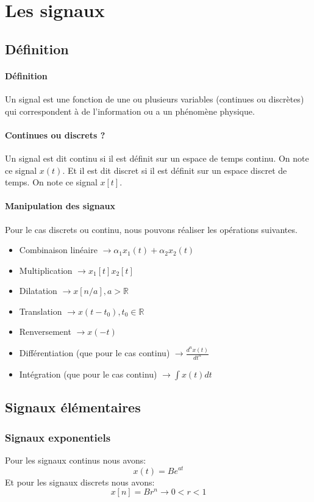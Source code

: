 \documentclass{report}
\begin{document}
\chapter{Les signaux}
\section{Définition}
\subsubsection{Définition}
Un signal est une fonction de une ou plusieurs variables (continues ou discrètes) qui correspondent à de l'information ou a un phénomène physique.

\subsubsection{Continues ou discrets ?}
Un signal est dit continu si il est définit sur un espace de temps continu. On note ce signal $x(t)$. Et il est dit discret si il est définit sur un espace discret de temps. On note ce signal $x[t]$.

\subsubsection{Manipulation des signaux}
Pour le cas discrets ou continu, nous pouvons réaliser les opérations suivantes.
\begin{itemize}
\item Combinaison linéaire $\rightarrow \alpha_{1}x_{1}(t) + \alpha_{2}x_{2}(t)$
\item Multiplication $ \rightarrow x_{1}[t]x_{2}[t]$
\item Dilatation $ \rightarrow x[n/a], a > \mathbb{R}$
\item Translation $ \rightarrow x(t - t_0), t_0 \in \mathbb{R}$
\item Renversement $ \rightarrow x(-t)$
\item Différentiation (que pour le cas continu) $ \rightarrow \frac{d^n x(t)}{dt^n}$
\item Intégration (que pour le cas continu) $\rightarrow \int x(t) dt$
\end{itemize}

\section{Signaux élémentaires}
\subsection{Signaux exponentiels}
Pour les signaux continus nous avons:
\begin{equation}
x(t) = B e^{at}
\end{equation}
Et pour les signaux discrets nous avons:
\begin{equation}
x[n] = Br^n \rightarrow 0 < r < 1
\end{equation}
\end{document}
